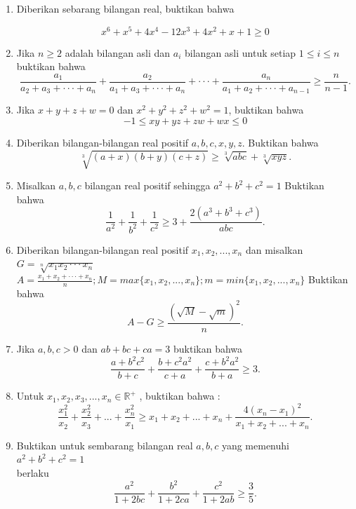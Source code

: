 \documentclass[12pt]{scrartcl}
\begin{document}
\begin{enumerate}
\item Diberikan sebarang bilangan real, buktikan bahwa

\[x^{6}+x^{5}+4x^{4}-12x^{3}+4x^{2}+x+1\ge0\]

\item Jika \(n\ge2\) adalah bilangan asli dan \(a_{i}\) bilangan asli untuk setiap \(1\le i\le n\)
buktikan bahwa
\[\frac{a_{1}}{a_{2}+a_{3}+\cdot\cdot\cdot+a_{n}}+\frac{a_{2}}{a_{1}+a_{3}+\cdot\cdot\cdot+a_{n}}+\cdot\cdot\cdot+\frac{a_{n}}{a_{1}+a_{2}+\cdot\cdot\cdot+a_{n-1}}\ge\frac{n}{n-1}.\]

\item Jika $x + y + z + w = 0$ dan $x^2 + y^2 + z^2 + w^2 = 1$, buktikan bahwa
\[-1\le xy+yz+zw+wx\le0\]

\item Diberikan bilangan-bilangan real positif $a, b, c, x, y, z$. Buktikan bahwa
\[\sqrt[3]{(a+x)(b+y)(c+z)}\ge\sqrt[3]{abc}+\sqrt[3]{xyz}.\]

\item Misalkan $a, b, c $ bilangan real positif sehingga \(a^{2}+b^{2}+c^{2}=1\) Buktikan bahwa
\[\frac{1}{a^{2}}+\frac{1}{b^{2}}+\frac{1}{c^{2}}\ge3+\frac{2(a^{3}+b^{3}+c^{3})}{abc}.\]
\item Diberikan bilangan-bilangan real positif \(x_{1},x_{2},...,x_{n}\) dan misalkan \(G=\sqrt[n]{x_{1}x_{2}\cdot\cdot\cdot x_{n}}\) \\
\(A=\frac{x_{1}+x_{2}+\cdot\cdot\cdot+x_{n}}{n};M=max\{x_{1},x_{2},...,x_{n}\};m=min\{x_{1},x_{2},...,x_{n}\}\) Buktikan \\
bahwa \\
\[A-G\ge\frac{(\sqrt{M}-\sqrt{m})^{2}}{n}.\]

\item Jika $a,b,c>0$ dan \(ab+bc+ca=3\) buktikan bahwa \\
\[\frac{a+b^{2}c^{2}}{b+c}+\frac{b+c^{2}a^{2}}{c+a}+\frac{c+b^{2}a^{2}}{b+a}\ge3.\]

\item Untuk \(x_{1},x_{2},x_{3},...,x_{n}\in\mathbb{R}^{+}\) , buktikan bahwa : \\
\[\frac{x_{1}^{2}}{x_{2}}+\frac{x_{2}^{2}}{x_{3}}+...+\frac{x_{n}^{2}}{x_{1}}\ge x_{1}+x_{2}+...+x_{n}+\frac{4(x_{n}-x_{1})^{2}}{x_{1}+x_{2}+...+x_{n}}.\]

\item Buktikan untuk sembarang bilangan real $a, b, c$ yang memenuhi \(a^{2}+b^{2}+c^{2}=1\) \\
berlaku \\
\[\frac{a^{2}}{1+2bc}+\frac{b^{2}}{1+2ca}+\frac{c^{2}}{1+2ab}\ge\frac{3}{5}.\]


\end{enumerate}
\end{document}
